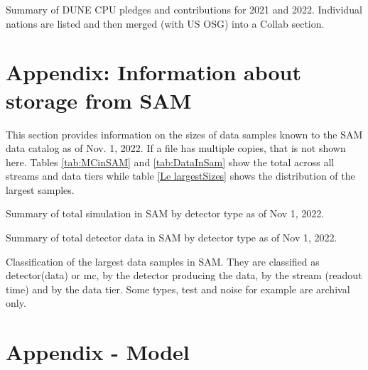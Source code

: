 \documentclass[12pt]{article}
\begin{document}
\begin{table}[ht]
\centering{}
 \label{tab:CPUUsage}
\caption{Summary  of DUNE CPU pledges and contributions for 2021 and 2022.  Individual nations are listed and then merged (with US OSG) into a Collab section.  }
\end{table}




\clearpage
\section{Appendix: Information about storage from SAM}\label{storage}

This section provides information on the sizes of data samples known to the SAM data catalog as of Nov. 1, 2022.  If a file has multiple copies, that is not shown here.  Tables \ref{tab:MCinSAM} and \ref{tab:DataInSam} show the total across all streams and data tiers while table \ref{Le largestSizes} shows the distribution of the largest samples.  


\begin{table}[ht]
 \centering{}
 \label{tab:MCinSAM}
\caption{Summary  of total simulation in SAM by detector type as of Nov 1, 2022.}
\end{table}

\begin{table}[ht]
 \centering{}
 \label{tab:DataInSam}
\caption{Summary  of total detector data in SAM by detector type as of Nov 1, 2022.}
\end{table}
\clearpage

\begin{table}[ht]
 \centering{}
 \label{tab:LargestSizes}
\caption{Classification of the largest data samples in SAM.  They are classified as detector(data) or mc, by the detector producing the data, by the stream (readout time) and by the data tier.  Some types, test and noise for example are archival only.  }
\end{table}

\section{Appendix - Model }

\end{document}
